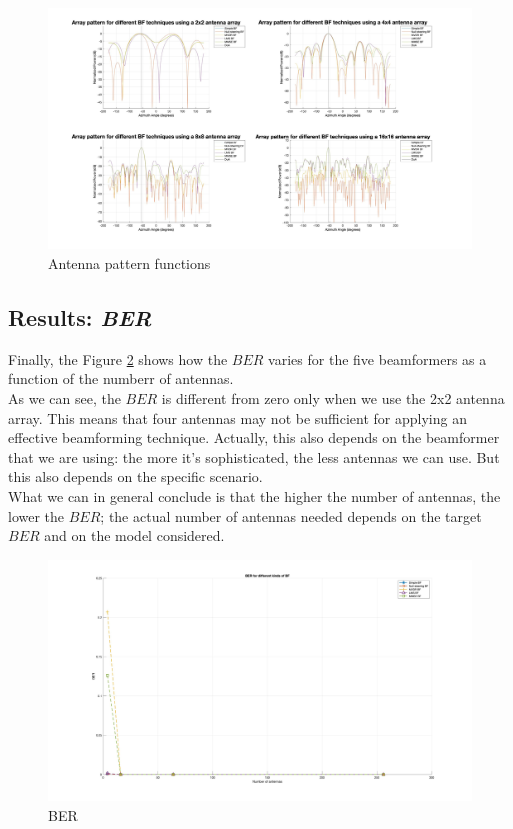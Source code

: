 \begin{figure}[ht]
    \includegraphics[width=\linewidth]{Array_pattern.jpg}
    \caption{Antenna pattern functions}
    \label{fig:Array_pattern}
\end{figure}

\subsection{Results: \textit{BER}}

Finally, the Figure \ref{fig:BER} shows how the $BER$ varies for the five beamformers as a function of the numberr of antennas.\\
As we can see, the $BER$ is different from zero only when we use the 2x2 antenna array. This means that four antennas may not
be sufficient for applying an effective beamforming technique. Actually, this also depends on the beamformer that we are using:
the more it's sophisticated, the less antennas we can use. But this also depends on the specific scenario. \\
What we can in general conclude is that the higher the number of antennas, the lower the $BER$; the actual number of antennas 
needed depends on the target $BER$ and on the model considered.

\begin{figure}[ht]
    \includegraphics[width=\linewidth]{BER.jpg}
    \caption{BER}
    \label{fig:BER}
\end{figure}